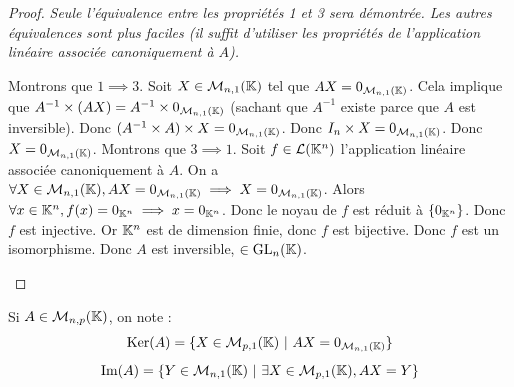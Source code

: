 \documentclass[12pt, a4paper]{report}
\begin{document}
\begin{proof}
    \textit{Seule l'équivalence entre les propriétés 1 et 3 sera démontrée. Les autres équivalences sont plus faciles (il suffit d'utiliser les propriétés de l'application linéaire associée canoniquement à $A$).}

    \begin{outline}
        \1 Montrons que $1 \implies 3$.
        \2 Soit $X \in \mathcal M_{n,1}(\mathbb{K})$ tel que $AX = 0_{\mathcal M_{n,1}(\mathbb{K})}$.
        \2 Cela implique que $A^{-1} \times (AX) = A^{-1} \times 0_{\mathcal M_{n,1}(\mathbb{K})}$ (sachant que $A^{-1}$ existe parce que $A$ est inversible).
        \2 Donc $(A^{-1} \times A) \times X = 0_{\mathcal M_{n,1}(\mathbb{K})}$.
        \2 Donc $I_n \times X = 0_{\mathcal M_{n,1}(\mathbb{K})}$.
        \2 Donc $X = 0_{\mathcal M_{n,1}(\mathbb{K})}$.
        \1 Montrons que $3 \implies 1$.
        \2 Soit $f \in \mathcal L(\mathbb{K}^n)$ l'application linéaire associée canoniquement à $A$.
        \2 On a $\forall X \in \mathcal M_{n,1}(\mathbb{K}), AX = 0_{\mathcal M_{n,1}(\mathbb{K})} \implies X = 0_{\mathcal M_{n,1}(\mathbb{K})}$.
        \2 Alors $\forall x \in \mathbb{K}^n, f(x) = 0_{\mathbb{K}^n} \implies x = 0_{\mathbb{K}^n}$.
        \2 Donc le noyau de $f$ est réduit à $\{0_{\mathbb{K}^n}\}$.
        \2 Donc $f$ est injective.
        \2 Or $\mathbb{K}^n$ est de dimension finie, donc $f$ est bijective.
        \2 Donc $f$ est un isomorphisme.
        \2 Donc $A$ est inversible, $\in \mathrm{GL}_n(\mathbb{K})$.
    \end{outline}
\end{proof}

\begin{remark}
    Si $A \in \mathcal M_{n,p}(\mathbb{K})$, on note :
    $$\mathrm{Ker}(A) = \{X \in \mathcal M_{p,1}(\mathbb{K})~|~AX = 0_{\mathcal M_{n,1}(\mathbb{K})}\}$$
    $$\mathrm{Im}(A)  = \{Y \in \mathcal M_{n,1}(\mathbb{K})~|~\exists X \in \mathcal M_{p,1}(\mathbb{K}), AX = Y\}$$
\end{remark}
\end{document}
